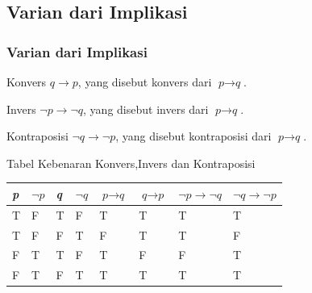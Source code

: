 \documentclass[handout]{beamer}
\theoremstyle{definition}
\theoremstyle{example}
\begin{document}
\subsection{Varian dari Implikasi}
\begin{frame}
	\frametitle{Varian dari Implikasi}
  \small	
	\begin{block}{Konvers}
	$q \rightarrow p$, yang disebut konvers dari $\textit{p} \rightarrow \textit{q}$.
     \end{block}	
	\begin{block}{Invers}
	$\neg\textit{p}\rightarrow\neg\textit{q}$, yang disebut invers dari $\textit{p} \rightarrow \textit{q}$.\\
    \end{block}	
	\begin{block}{Kontraposisi}
	$\neg\textit{q} \rightarrow\neg\textit{p}$, yang disebut kontraposisi dari $\textit{p} \rightarrow \textit{q}$.\\
    \end{block}
	\begin{block}{Tabel Kebenaran Konvers,Invers dan Kontraposisi}	
		\begin{tabular}{ | l | l | l | l | l | l | l |l |}
			\hline
			\textit{p} & $\neg\textit{p}$ & \textit{q} & $\neg\textit{q}$ & $\textit{p}\rightarrow\textit{q}$ & $\textit{q}\rightarrow\textit{p}$ & $\neg\textit{p}\rightarrow\neg\textit{q}$ & $\neg\textit{q}\rightarrow\neg\textit{p}$\\ \hline
			T & F & T & F & T & T & T & T \\ \hline
			T & F & F & T & F & T & T & F \\ \hline
			F & T & T & F & T & F & F & T \\ \hline
			F & T & F & T & T & T & T & T \\     		 
			\hline
		\end{tabular}
   \end{block}	
	
\end{frame}
\end{document}
